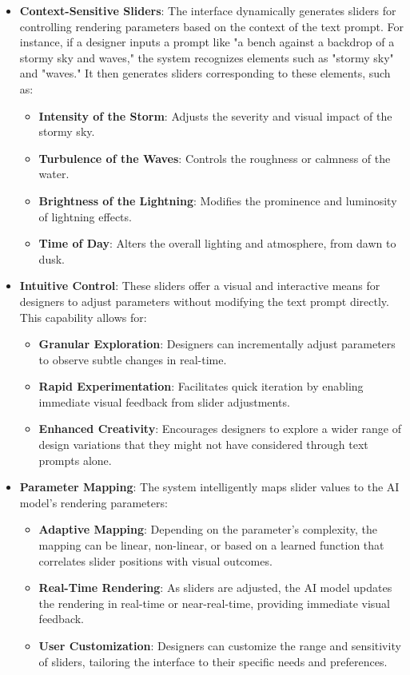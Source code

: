 \documentclass{article}
\begin{document}
\begin{itemize}
    \item \textbf{Context-Sensitive Sliders}: The interface dynamically generates sliders for controlling rendering parameters based on the context of the text prompt. For instance, if a designer inputs a prompt like "a bench against a backdrop of a stormy sky and waves," the system recognizes elements such as "stormy sky" and "waves." It then generates sliders corresponding to these elements, such as:

    \begin{itemize}
        \item \textbf{Intensity of the Storm}: Adjusts the severity and visual impact of the stormy sky.
        \item \textbf{Turbulence of the Waves}: Controls the roughness or calmness of the water.
        \item \textbf{Brightness of the Lightning}: Modifies the prominence and luminosity of lightning effects.
        \item \textbf{Time of Day}: Alters the overall lighting and atmosphere, from dawn to dusk.
    \end{itemize}

    \item \textbf{Intuitive Control}: These sliders offer a visual and interactive means for designers to adjust parameters without modifying the text prompt directly. This capability allows for:

    \begin{itemize}
        \item \textbf{Granular Exploration}: Designers can incrementally adjust parameters to observe subtle changes in real-time.
        \item \textbf{Rapid Experimentation}: Facilitates quick iteration by enabling immediate visual feedback from slider adjustments.
        \item \textbf{Enhanced Creativity}: Encourages designers to explore a wider range of design variations that they might not have considered through text prompts alone.
    \end{itemize}

    \item \textbf{Parameter Mapping}: The system intelligently maps slider values to the AI model's rendering parameters:

    \begin{itemize}
        \item \textbf{Adaptive Mapping}: Depending on the parameter's complexity, the mapping can be linear, non-linear, or based on a learned function that correlates slider positions with visual outcomes.
        \item \textbf{Real-Time Rendering}: As sliders are adjusted, the AI model updates the rendering in real-time or near-real-time, providing immediate visual feedback.
        \item \textbf{User Customization}: Designers can customize the range and sensitivity of sliders, tailoring the interface to their specific needs and preferences.
    \end{itemize}


\end{itemize}
\end{document}

